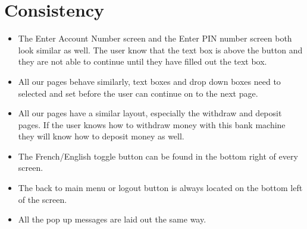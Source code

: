 \documentclass[10pt]{article}
\begin{document}
\section{Consistency} %
\begin{itemize}
\item The Enter Account Number screen and the Enter PIN number screen both look similar as well. The user know that the text box is above the button and they are not able to continue until they have filled out the text box.
\item All our pages behave similarly, text boxes and drop down boxes need to selected and set before the user can continue on to the next page.
\item All our pages have a similar layout, especially the withdraw and deposit pages. If the user knows how to withdraw money with this bank machine they will know how to deposit money as well.
\item The French/English toggle button can be found in the bottom right of every screen.
\item The back to main menu or logout button is always located on the bottom left of the screen.
\item All the pop up messages are laid out the same way. 
\end{itemize}
\end{document}
